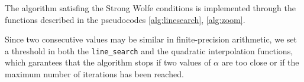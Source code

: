 			The algorithm satisfing the Strong Wolfe conditions is implemented through the functions described in the pseudocodes \ref{alg:linesearch}, \ref{alg:zoom}.

			Since two consecutive values may be similar in finite-precision arithmetic, we set a threshold in both the \texttt{line\_search} and the quadratic interpolation functions, which garantees that the algorithm stops if two values of $\alpha$ are too close or if the maximum number of iterations has been reached.





			

